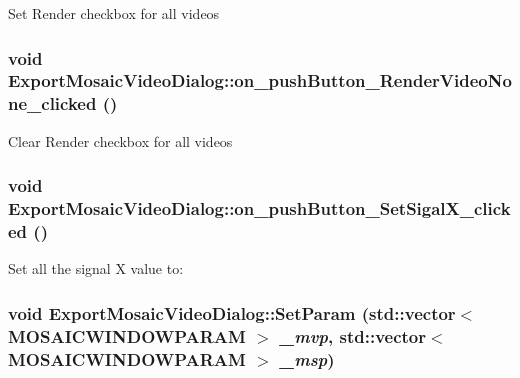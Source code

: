 Set Render checkbox for all videos \hypertarget{class_export_mosaic_video_dialog_7d7a558b4012d128c2a528a19613286c}{
\subsubsection[{on\_\-pushButton\_\-RenderVideoNone\_\-clicked}]{\setlength{\rightskip}{0pt plus 5cm}void ExportMosaicVideoDialog::on\_\-pushButton\_\-RenderVideoNone\_\-clicked ()}}
\label{class_export_mosaic_video_dialog_7d7a558b4012d128c2a528a19613286c}


Clear Render checkbox for all videos \hypertarget{class_export_mosaic_video_dialog_35e21eb8cc6f392df51488a93c9e965d}{
\subsubsection[{on\_\-pushButton\_\-SetSigalX\_\-clicked}]{\setlength{\rightskip}{0pt plus 5cm}void ExportMosaicVideoDialog::on\_\-pushButton\_\-SetSigalX\_\-clicked ()}}
\label{class_export_mosaic_video_dialog_35e21eb8cc6f392df51488a93c9e965d}


Set all the signal X value to: \hypertarget{class_export_mosaic_video_dialog_90a280c0cc8cd6edbd5ce811ebaf76a7}{
\subsubsection[{SetParam}]{\setlength{\rightskip}{0pt plus 5cm}void ExportMosaicVideoDialog::SetParam (std::vector$<$ {\bf MOSAICWINDOWPARAM} $>$ {\em \_\-mvp}, \/  std::vector$<$ {\bf MOSAICWINDOWPARAM} $>$ {\em \_\-msp})}}
\label{class_export_mosaic_video_dialog_90a280c0cc8cd6edbd5ce811ebaf76a7}


